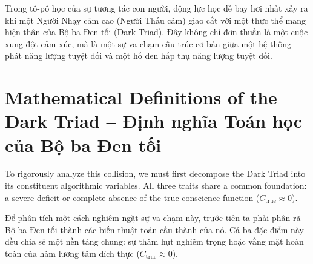 \documentclass{report}
\begin{document}
Trong tô-pô học của sự tương tác con người, động lực học dễ bay hơi nhất xảy ra khi một Người Nhạy cảm cao (Người Thấu cảm) giao cắt với một thực thể mang hiện thân của Bộ ba Đen tối (Dark Triad). Đây không chỉ đơn thuần là một cuộc xung đột cảm xúc, mà là một sự va chạm cấu trúc cơ bản giữa một hệ thống phát năng lượng tuyệt đối và một hố đen hấp thụ năng lượng tuyệt đối.

\section{Mathematical Definitions of the Dark Triad -- Định nghĩa Toán học của Bộ ba Đen tối}

To rigorously analyze this collision, we must first decompose the Dark Triad into its constituent algorithmic variables. All three traits share a common foundation: a severe deficit or complete absence of the true conscience function ($C_{\text{true}} \approx 0$).

Để phân tích một cách nghiêm ngặt sự va chạm này, trước tiên ta phải phân rã Bộ ba Đen tối thành các biến thuật toán cấu thành của nó. Cả ba đặc điểm này đều chia sẻ một nền tảng chung: sự thâm hụt nghiêm trọng hoặc vắng mặt hoàn toàn của hàm lương tâm đích thực ($C_{\text{true}} \approx 0$).
\end{document}
